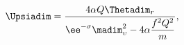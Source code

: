 \begin{equation}
\label{eq:upsitheta_r}
\Upsiadim = \dfrac{4 \alpha Q\Thetadim_r }{\ee^{-\sigma}
\madim_\upsilon^2 - 4 \alpha \dfrac{f^2 Q^2}{m}},
\end{equation}

